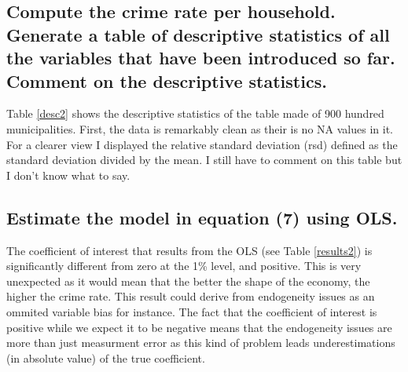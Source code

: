\subsection{Compute the crime rate per household. Generate a table of descriptive statistics of all the
variables that have been introduced so far. Comment on the descriptive statistics.}

Table \ref{desc2} shows the descriptive statistics of the table made of
900 hundred municipalities. First, the data is remarkably clean as their is no
NA values in it. For a clearer view I displayed the relative standard deviation (rsd)
defined as the standard deviation divided by the mean. I still have to comment on
this table but I don't know what to say.
\subsection{Estimate the model in equation (7) using OLS.}

The coefficient of interest that results from the OLS (see Table \ref{results2}) is significantly different from zero at the 1\% level, and positive.
This is very unexpected as it would mean that the better the shape of the economy, the higher the crime rate. This result
could derive from endogeneity issues as an ommited variable bias for instance.
The fact that the coefficient of interest is positive while we expect it to be negative
means that the endogeneity issues are more than just measurment error as this kind of
problem leads underestimations (in absolute value) of the true coefficient.

